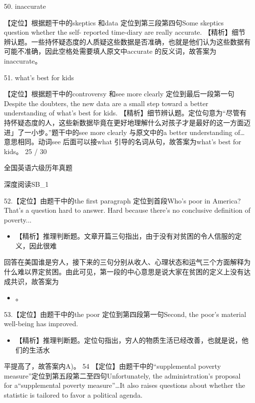 \documentclass[UTF8,11pt]{ctexart}
\begin{document}
50. inaccurate


【定位】根据题干中的skeptics 和data 定位到第三段第四句Some skeptics question whether the self- reported time-diary are really accurate. 【精析】细节辨认题。一些持怀疑态度的人质疑这些数据是否准确，也就是他们认为这些数据有可能不准确，因此空格处需要填人原文中accurate 的反义词，故答案为inaccurate。


51. what's best for kids


【定位】根据题干中的controversy 和see more clearly 定位到最后一段第一句Despite the doubters, the new data are a small step toward a better understanding of what's best for kids. 【精析】细节辨认题。定位句意为“尽管有持怀疑态度的人，这些新数据毕竟在更好地理解什么对孩子才是最好的这一方面迈进」了一小步。”题干中的see more clearly 与原文中的a better understanding of…意思相同。动词see 后面可以接what 引导的名词从句，故答案为what's best for kids。 25 / 30


全国英语六级历年真题


深度阅读SB\_1


52.【定位】由题干中的the first paragraph 定位到首段Who's poor in America? That's a question hard to answer. Hard because there's no conclusive definition of poverty...


\begin{itemize}[leftmargin=2em,itemsep=.2em,topsep=.4em]\item[D.] 【精析】推理判断题。文章开篇三句指出，由于没有对贫困的令人信服的定义，因此很难
\end{itemize}

回答在美国谁是穷人，接下来的三句分别从收人、心理状态和运气三个方面解释为什么难以界定贫困。由此可见，第一段的中心意思是说大家在贫困的定义上没有达成共识，故答案为


\begin{itemize}[leftmargin=2em,itemsep=.2em,topsep=.4em]\item[D.] 。
\end{itemize}

53.【定位】由题干中的the poor 定位到第四段第一句Second, the poor's material well-being has improved.


\begin{itemize}[leftmargin=2em,itemsep=.2em,topsep=.4em]\item[A.] 【精析】推理判断题。定位句指出，穷人的物质生活已经改善，也就是说，他们的生活水
\end{itemize}

平提高了，故答案内A)。 54 【定位】由题干中的“supplemental poverty measure”定位到第五段第二至四句Unfortunately, the administration's proposal for a“supplemental poverty measure”…It also raises questions about whether the statistic is tailored to favor a political agenda.
\end{document}
